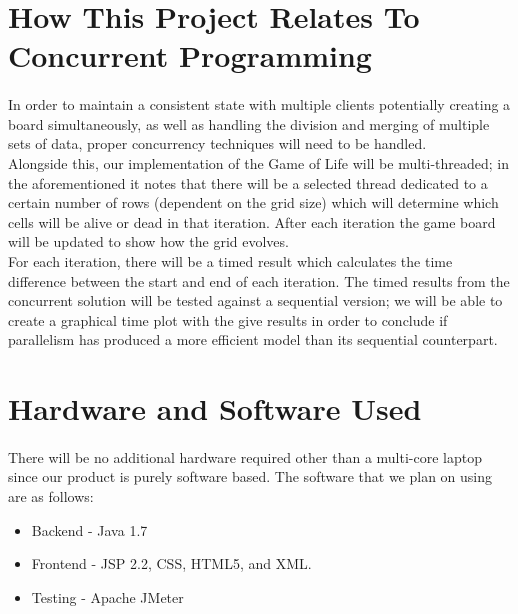 \documentclass[12pt,a4paper]{report}
\begin{document}
\section{How This Project Relates To Concurrent Programming}
\paragraph{}
In order to maintain a consistent state with multiple clients potentially creating a board simultaneously, as well as handling the division and merging of multiple sets of data, proper concurrency techniques will need to be handled. \\

Alongside this, our implementation of the Game of Life will be multi-threaded; in the aforementioned it notes that there will be a selected thread dedicated to a certain number of rows (dependent on the grid size) which will determine which cells will be alive or dead in that iteration. After each iteration the game board will be updated to show how the grid evolves. \\

For each iteration, there will be a timed result which calculates the time difference between the start and end of each iteration. The timed results from the concurrent solution will be tested against a sequential version; we will be able to create a graphical time plot with the give results in order to conclude if parallelism has produced a more efficient model than its sequential counterpart.
\section{Hardware and Software Used}
\paragraph{}
There will be no additional hardware required other than a multi-core laptop since our product is purely software based.
The software that we plan on using are as follows: 
\begin{itemize}
\item Backend - Java 1.7
\item Frontend - JSP 2.2, CSS, HTML5, and XML.
\item Testing - Apache JMeter
\end{itemize}
\end{document}
